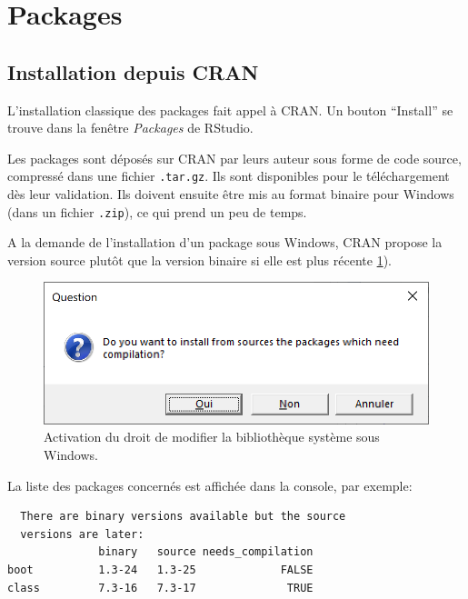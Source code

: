 \documentclass[
  12pt,
  french,
  a4paper,
  extrafontsizes,onecolumn,openright
  ]{memoir}
\begin{document}
\normalsize

\hypertarget{packages}{%
\section{Packages}\label{packages}}

\hypertarget{installation-depuis-cran}{%
\subsection{Installation depuis CRAN}\label{installation-depuis-cran}}

L'installation classique des packages fait appel à CRAN.
Un bouton \enquote{Install} se trouve dans la fenêtre \emph{Packages} de RStudio.

Les packages sont déposés sur CRAN par leurs auteur sous forme de code source, compressé dans une fichier \texttt{.tar.gz}.
Ils sont disponibles pour le téléchargement dès leur validation.
Ils doivent ensuite être mis au format binaire pour Windows (dans un fichier \texttt{.zip}), ce qui prend un peu de temps.

A la demande de l'installation d'un package sous Windows, CRAN propose la version source plutôt que la version binaire si elle est plus récente \ref{fig:R-BinaryPkg}).



\scriptsize

\begin{figure}

{\centering \includegraphics[width=0.8\linewidth]{images/R-BinaryPkg} 

}

\caption{Activation du droit de modifier la bibliothèque système sous Windows.}\label{fig:R-BinaryPkg}
\end{figure}

\normalsize

La liste des packages concernés est affichée dans la console, par exemple:

\begin{verbatim}
  There are binary versions available but the source 
  versions are later:
              binary   source needs_compilation
boot          1.3-24   1.3-25             FALSE
class         7.3-16   7.3-17              TRUE
\end{verbatim}
\end{document}
